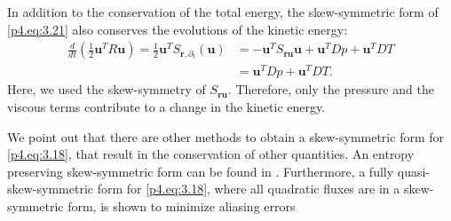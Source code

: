 In addition to the conservation of the total energy, the skew-symmetric form of \eqref{p4.eq:3.21} also conserves the evolutions of the kinetic energy:
\begin{equation} \label{p4.eq:3.26}
\begin{aligned}
	\frac{d}{dt} ( \frac 1 2 \mathbf u^T R\mathbf u) = \frac 1 2 \mathbf u^T S_{\mathbf r,\partial_t} (\mathbf u) &= -\mathbf u ^T S_{\mathbf r \mathbf u} \mathbf u + \mathbf u^T D p + \mathbf u^T DT \\
	&= \mathbf u^T D p + \mathbf u^T DT.
\end{aligned}
\end{equation}
Here, we used the skew-symmetry of $S_{\mathbf r \mathbf u}$. Therefore, only the pressure and the viscous terms contribute to a change in the kinetic energy.

We point out that there are other methods to obtain a skew-symmetric form for \eqref{p4.eq:3.18}, that result in the conservation of other quantities. An entropy preserving skew-symmetric form can be found in \cite{sjogreen2010skew}. Furthermore, a fully quasi-skew-symmetric form for \eqref{p4.eq:3.18}, where all quadratic fluxes are in a skew-symmetric form, is shown to minimize aliasing errors \cite{honein2004higher,honein2005numerical}

